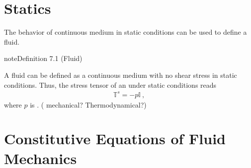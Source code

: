 \documentclass[letterpaper,10pt,english]{jupyterBook}
\begin{document}
\sphinxstepscope


\chapter{Statics}
\label{\detokenize{ch/fluids/statics:statics}}\label{\detokenize{ch/fluids/statics:fluid-mechanics-statics}}\label{\detokenize{ch/fluids/statics::doc}}
\sphinxAtStartPar
The behavior of continuous medium in static conditions can be used to define a fluid.
\label{ch/fluids/statics:definition-0}
\begin{sphinxadmonition}{note}{Definition 7.1 (Fluid)}



\sphinxAtStartPar
A fluid can be defined as a continuous medium with no shear stress in static conditions. Thus, the stress tensor of an  under static conditions reads
\begin{equation*}
\begin{split}\mathbb{T}^s = - p \mathbb{I} \ ,\end{split}
\end{equation*}
\sphinxAtStartPar
where \(p\) is . ( mechanical? Thermodynamical?)
\end{sphinxadmonition}

\sphinxstepscope


\chapter{Constitutive Equations of Fluid Mechanics}
\label{\detokenize{ch/fluids/constitutive-equations:constitutive-equations-of-fluid-mechanics}}\label{\detokenize{ch/fluids/constitutive-equations:fluid-mechanics-constutive-equations}}\label{\detokenize{ch/fluids/constitutive-equations::doc}}
\end{document}
